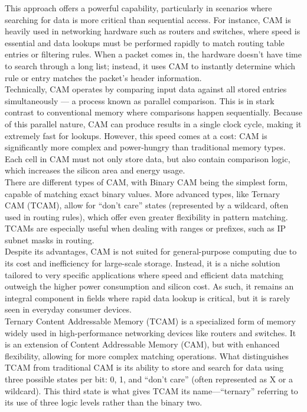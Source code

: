 \documentclass[parindent=0pt]{article}
\begin{document}
This approach offers a powerful capability, particularly in scenarios where searching for data is more critical than sequential access. For instance, CAM is heavily used in networking hardware such as routers and switches, where speed is essential and data lookups must be performed rapidly to match routing table entries or filtering rules. When a packet comes in, the hardware doesn’t have time to search through a long list; instead, it uses CAM to instantly determine which rule or entry matches the packet’s header information.\\

Technically, CAM operates by comparing input data against all stored entries simultaneously — a process known as parallel comparison. This is in stark contrast to conventional memory where comparisons happen sequentially. Because of this parallel nature, CAM can produce results in a single clock cycle, making it extremely fast for lookups. However, this speed comes at a cost: CAM is significantly more complex and power-hungry than traditional memory types. Each cell in CAM must not only store data, but also contain comparison logic, which increases the silicon area and energy usage.\\

There are different types of CAM, with Binary CAM being the simplest form, capable of matching exact binary values. More advanced types, like Ternary CAM (TCAM), allow for “don’t care” states (represented by a wildcard, often used in routing rules), which offer even greater flexibility in pattern matching. TCAMs are especially useful when dealing with ranges or prefixes, such as IP subnet masks in routing.\\

Despite its advantages, CAM is not suited for general-purpose computing due to its cost and inefficiency for large-scale storage. Instead, it is a niche solution tailored to very specific applications where speed and efficient data matching outweigh the higher power consumption and silicon cost. As such, it remains an integral component in fields where rapid data lookup is critical, but it is rarely seen in everyday consumer devices.\\

Ternary Content Addressable Memory (TCAM) is a specialized form of memory widely used in high-performance networking devices like routers and switches. It is an extension of Content Addressable Memory (CAM), but with enhanced flexibility, allowing for more complex matching operations. What distinguishes TCAM from traditional CAM is its ability to store and search for data using three possible states per bit: 0, 1, and “don’t care” (often represented as X or a wildcard). This third state is what gives TCAM its name—“ternary” referring to its use of three logic levels rather than the binary two.\\
\end{document}
